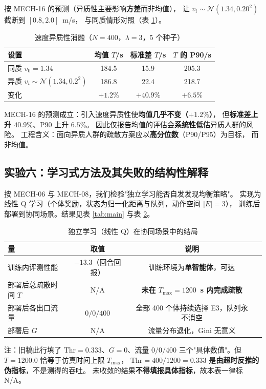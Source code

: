 按 MECH-16 的预测（异质性主要影响\textbf{方差}而非均值），
让 $v_i\sim\mathcal N(1.34,0.20^2)$ 截断到 $[0.8,2.0]$~m/s，
与同质情形对照（表 \ref{tab:hetero}）。

\begin{table}[H]
  \centering
  \caption{速度异质性消融（$N=400$，$\lambda=3$，5 个种子）}
  \label{tab:hetero}
  \begin{tabular}{lccc}
    \toprule
    设置 & 均值 $T$/s & 标准差 $T$/s & $T$ 的 P90/s \\
    \midrule
    同质 $v_0=1.34$ & 184.5 & 15.9 & 205.3 \\
    异质 $v_i\sim\mathcal N(1.34,0.2^2)$ & 186.8 & 22.4 & 218.7 \\
    \midrule
    变化 & $+1.2\%$ & $+40.9\%$ & $+6.5\%$ \\
    \bottomrule
  \end{tabular}
\end{table}

\begin{csftake}[实验五的结论]
MECH-16 的预测成立：引入速度异质性使\textbf{均值几乎不变（$+1.2\%$）}，
但\textbf{标准差上升 $40.9\%$}、P90 上升 $6.5\%$。
因此仅报告均值的评估会\textbf{系统性低估}异质人群的风险。
工程含义：面向异质人群的疏散方案应以\textbf{高分位数}（P90/P95）为目标，
而非均值。
\end{csftake}

\subsection{实验六：学习式方法及其失败的结构性解释}
\label{sec:fail}

按 MECH-06 与 MECH-08，我们检验"独立学习能否自发发现均衡策略"。
实现为线性 Q 学习（个体奖励，状态为归一化距离与队列，动作空间 $|E|=3$），
训练后部署到协同场景。结果见表 \ref{tab:main} 与表 \ref{tab:ql}。

\begin{table}[H]
  \centering
  \caption{独立学习（线性 Q）在协同场景中的结局}
  \label{tab:ql}
  \begin{tabular}{lccc}
    \toprule
    量 & 取值 & 说明 \\
    \midrule
    训练内评测性能 & $-13.3$（回合回报） & 训练环境为\textbf{单智能体}，可达 \\
    部署后总疏散时间 $T$ & N/A & \textbf{未在 $T_{\max}=1200$~s 内完成疏散} \\
    部署后各出口流量 & $0/0/400$ & 全部 400 个体持续选择 E3，队列永不消空 \\
    部署后 $G$ & N/A & 流量分布退化，Gini 无意义 \\
    \bottomrule
  \end{tabular}
  \begin{flushleft}
  \footnotesize 注：旧稿此行填了 $\mathrm{Thr}=0.333$、$G=0$、流量 $0/0/400$
  三个"具体数值"。但 $T=1200.0$ 恰等于仿真时间上限 $T_{\max}$，
  $\mathrm{Thr}=400/1200=0.333$ 是\textbf{由超时反推的伪指标}，不是测得的吞吐。
  未收敛的结果\textbf{不得填报具体指标}，故本表一律标 N/A。
  \end{flushleft}
\end{table}

